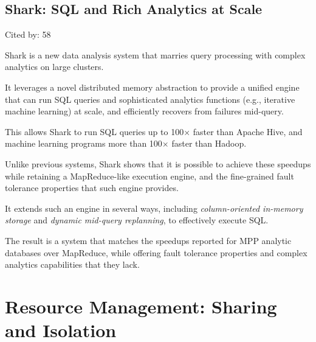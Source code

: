 \documentclass[a4paper,11pt]{article}
\begin{document}
\subsection*{Shark: SQL and Rich Analytics at Scale}
{\color{cyan} {\color{magenta} Cited by: 58}

{\color{black} Shark\cite{shark}}
is a new data analysis system that 
marries query processing with complex analytics on large clusters. 

It leverages 
a novel distributed memory abstraction 
to provide a unified engine that can run 
SQL queries and sophisticated analytics functions (e.g., iterative machine learning) at scale, 
and efficiently recovers from failures mid-query. 

This allows Shark to run 
SQL queries up to 100$\times$ faster than Apache Hive, and 
machine learning programs more than 100$\times$ faster than Hadoop.

Unlike previous systems, 
Shark shows that 
it is possible to achieve these speedups while retaining a MapReduce-like execution engine, and 
the fine-grained fault tolerance properties that such engine provides. 

It extends such an engine in several ways, 
including 
{\em column-oriented in-memory storage} and 
{\em dynamic mid-query replanning}, 
to effectively execute SQL. 

The result is a system that matches the speedups reported for MPP analytic databases over MapReduce, while 
offering fault tolerance properties and complex analytics capabilities that they lack.

}

\section{Resource Management: Sharing and Isolation}
\end{document}
